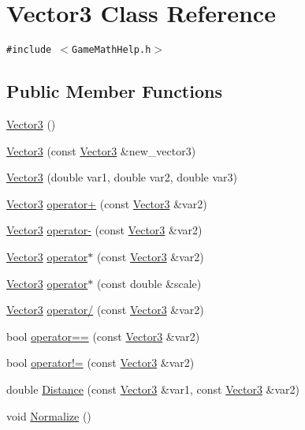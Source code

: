 \hypertarget{class_vector3}{
\section{Vector3 Class Reference}
\label{class_vector3}
}
{\tt \#include $<$GameMathHelp.h$>$}

\subsection*{Public Member Functions}
\begin{CompactItemize}
\item 
\hyperlink{class_vector3_0f49191f7e001e7f7ae1cb49522118b4}{Vector3} ()
\item 
\hyperlink{class_vector3_cfdd4e4142e161c45b28359cbae52885}{Vector3} (const \hyperlink{class_vector3}{Vector3} \&new\_\-vector3)
\item 
\hyperlink{class_vector3_3c54fb4515e8fb241fce22a2f34f794b}{Vector3} (double var1, double var2, double var3)
\item 
\hyperlink{class_vector3}{Vector3} \hyperlink{class_vector3_18adad640e9c9bccb83a5b24b6b3b404}{operator+} (const \hyperlink{class_vector3}{Vector3} \&var2)
\item 
\hyperlink{class_vector3}{Vector3} \hyperlink{class_vector3_7b08351b25c222db113bc6a08c668e88}{operator-} (const \hyperlink{class_vector3}{Vector3} \&var2)
\item 
\hyperlink{class_vector3}{Vector3} \hyperlink{class_vector3_c65e8d0ed44872b4f23b13cee52d19f1}{operator$\ast$} (const \hyperlink{class_vector3}{Vector3} \&var2)
\item 
\hyperlink{class_vector3}{Vector3} \hyperlink{class_vector3_bf38ed065170e4b757511ba6e9ae4ff5}{operator$\ast$} (const double \&scale)
\item 
\hyperlink{class_vector3}{Vector3} \hyperlink{class_vector3_0ab08b15cded7fd294334233b8157c05}{operator/} (const \hyperlink{class_vector3}{Vector3} \&var2)
\item 
bool \hyperlink{class_vector3_b420e00a2a719c5340743a0cb3154560}{operator==} (const \hyperlink{class_vector3}{Vector3} \&var2)
\item 
bool \hyperlink{class_vector3_1023dd678979df4187bd2447bff67b5c}{operator!=} (const \hyperlink{class_vector3}{Vector3} \&var2)
\item 
double \hyperlink{class_vector3_b1248a8c91f743e9eb2d849e76313587}{Distance} (const \hyperlink{class_vector3}{Vector3} \&var1, const \hyperlink{class_vector3}{Vector3} \&var2)
\item 
void \hyperlink{class_vector3_9c94cc16049543fc8edaba52c2b266b7}{Normalize} ()
\end{CompactItemize}
